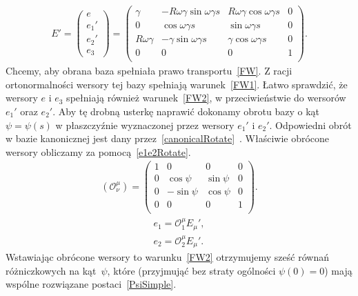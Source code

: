 \begin{align}\label{Esimpleprim}
E'=
\begin{pmatrix}
e\\
e_1'\\
e_2'\\
e_3
\end{pmatrix}
=
\begin{pmatrix}
\gamma          & -R\omega\gamma\sin\omega\gamma s  
& R\omega\gamma\cos\omega\gamma s & 0 \\
0                   & \cos\omega\gamma s                   
&  \sin\omega\gamma s                & 0 \\
R\omega\gamma  & -\gamma\sin\omega\gamma    s           
& \gamma\cos\omega\gamma s           & 0 \\
0                   &   0                                           
& 0                                      & 1 \\
\end{pmatrix}.
\end{align}
Chcemy, aby obrana baza spełniała prawo transportu~\eqref{FW}. 
Z racji ortonormalności wersory tej bazy spełniają warunek~\eqref{FW1}.
Łatwo sprawdzić, że wersory $e$ i $e_3$ spełniają również 
warunek~\eqref{FW2}, w przeciwieństwie do 
wersorów $e_1'$ oraz $e_2'$. Aby tę drobną usterkę naprawić 
dokonamy obrotu bazy o kąt $\psi=\psi(s)$ w płaszczyźnie wyznaczonej 
przez wersory $e_1'$ i $e_2'$. Odpowiedni obrót w bazie kanonicznej jest
dany przez~\eqref{canonicalRotate}~\cite{star1993algebra}.
Właściwie obrócone wersory obliczamy za pomocą~\eqref{e1e2Rotate}.
\begin{align}\label{canonicalRotate}
( \mathcal{O}^\mu_\nu )
=
\begin{pmatrix}
1 & 0           & 0             & 0 \\
0 & \cos\psi    & \sin\psi  & 0 \\
0 & -\sin\psi   & \cos\psi  & 0 \\
0 & 0           &0          & 1 \\
\end{pmatrix}.
\end{align}
\begin{align}\label{e1e2Rotate}
e_1 =  \mathcal{O}^\mu_1 E_\mu ', \\
e_2 =  \mathcal{O}^\mu_2 E_\mu ' .\nonumber
\end{align}
Wstawiając obrócone wersory to warunku~\eqref{FW2} otrzymujemy 
sześć równań różniczkowych na kąt~$\psi$, które (przyjmująć bez straty ogólności
$\psi(0)=0$) mają wspólne rozwiązane postaci~\eqref{PsiSimple}.
